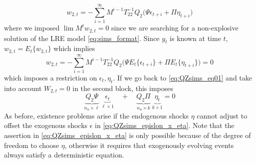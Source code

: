 \documentclass[a4paper,10pt]{article}  %
\begin{document}
\[
   w_{2,t} = - \sum_{i=1}^{\infty} M^{i-1} T_{22}^{-1} Q_2 \Big( \Psi \epsilon_{t+i} + \Pi \eta_{t+i} \Big)
\]
where we imposed $ \lim M^t w_{2,t} = 0 $ since we are searching for a non-explosive solution of the LRE model
\eqref{eq:sims_format}. Since $ y_{t} $ is known at time $t$, $ w_{2,t} = E_t \{w_{2,t} \}$ which implies
\[
   w_{2,t} = - \sum_{i=1}^{\infty} M^{i-1} T_{22}^{-1} Q_2 
         \Big( 
            \Psi E_t\big\{ \epsilon_{t+i} \big\} + 
            \Pi E_t \big\{\eta_{t+i} \big\}
         \Big) = 0
\]
which imposes a restriction on $ \epsilon_t,\eta_t $. If we go back to \eqref{eq:QZsims_eq01} and take into account $
W_{2,t} = 0$  in the second block, this imposes
\begin{equation}
   \label{eq:QZsims_epislon_x_eta}
   \underbrace{Q_2 \Psi}_{ n_u \times \ell } \ \underbrace{\epsilon_t}_{ \ell \times 1 } 
   \quad + \quad 
   \underbrace{Q_2 \Pi}_{ n_u \times k }     \ \underbrace{\eta_t}_{k\times 1} = 0
\end{equation}
As before, existence problems arise if the endogenous shocks $ \eta $ cannot adjust to offset the exogenous shocks
$\epsilon $ in \eqref{eq:QZsims_epislon_x_eta}. Note that the assertion in \eqref{eq:QZsims_epislon_x_eta} is only
possible because of the degree of freedom to choose $\eta$, otherwise it requires that exogenously evolving events
always satisfy a deterministic equation.





\clearpage
\newpage
% 
% 


% 
\end{document}
